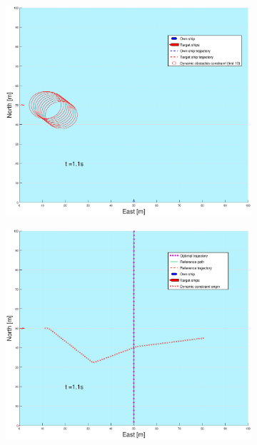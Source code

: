 \begin{figure}[!b]
\begin{subfigure}[b]{0.499\textwidth}
    \end{subfigure}
    \hfill
    \\
    \begin{subfigure}[b]{0.49\textwidth}
        \centering
        \includegraphics[width=\textwidth]{Images/Figures/enkel_SO/_Simple_0fig1_time=1}
    \end{subfigure}
    \hfill
    \begin{subfigure}[b]{0.499\textwidth}
        \centering
        \includegraphics[width=\textwidth]{Images/Figures/enkel_SO/_Simple_0fig999_time=1}

\end{subfigure}
\end{figure}
